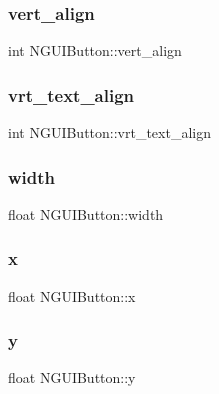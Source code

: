 \subsubsection{\texorpdfstring{vert\+\_\+align}{vert\_align}}
{\footnotesize\ttfamily int N\+G\+U\+I\+Button\+::vert\+\_\+align}

\hypertarget{class_n_g_u_i_button_a0150a42bbcf5870ce7f555af303b7583}{}\label{class_n_g_u_i_button_a0150a42bbcf5870ce7f555af303b7583} 
\subsubsection{\texorpdfstring{vrt\+\_\+text\+\_\+align}{vrt\_text\_align}}
{\footnotesize\ttfamily int N\+G\+U\+I\+Button\+::vrt\+\_\+text\+\_\+align}

\hypertarget{class_n_g_u_i_button_ad35ddea742ce8d44f2e283b9063bca25}{}\label{class_n_g_u_i_button_ad35ddea742ce8d44f2e283b9063bca25} 
\subsubsection{\texorpdfstring{width}{width}}
{\footnotesize\ttfamily float N\+G\+U\+I\+Button\+::width}

\hypertarget{class_n_g_u_i_button_aae6febe2f9a3a4162e18601129e011b2}{}\label{class_n_g_u_i_button_aae6febe2f9a3a4162e18601129e011b2} 
\subsubsection{\texorpdfstring{x}{x}}
{\footnotesize\ttfamily float N\+G\+U\+I\+Button\+::x}

\hypertarget{class_n_g_u_i_button_a024b8f5b19c1e99bf4f86c820c782a7f}{}\label{class_n_g_u_i_button_a024b8f5b19c1e99bf4f86c820c782a7f} 
\subsubsection{\texorpdfstring{y}{y}}
{\footnotesize\ttfamily float N\+G\+U\+I\+Button\+::y}

